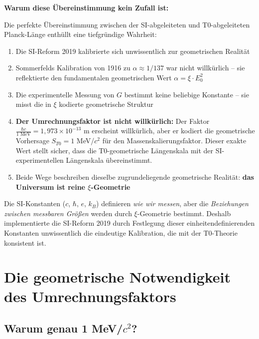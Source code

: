 \documentclass[12pt,a4paper]{article}
\begin{document}
	\begin{warning}
		\textbf{Warum diese {\"U}bereinstimmung kein Zufall ist:}
		
		Die perfekte {\"U}bereinstimmung zwischen der SI-abgeleiteten und T0-abgeleiteten Planck-L{\"a}nge enth{\"u}llt eine tiefgr{\"u}ndige Wahrheit:
		
		\begin{enumerate}
			\item Die SI-Reform 2019 kalibrierte sich unwissentlich zur geometrischen Realit{\"a}t
			
			\item Sommerfelds Kalibration von 1916 zu $\alpha \approx 1/137$ war nicht willk{\"u}rlich -- sie reflektierte den fundamentalen geometrischen Wert $\alpha = \xi \cdot E_0^2$
			
			\item Die experimentelle Messung von $G$ bestimmt keine beliebige Konstante -- sie misst die in $\xi$ kodierte geometrische Struktur
			
			\item \textbf{Der Umrechnungsfaktor ist nicht willk{\"u}rlich:} Der Faktor $\frac{\hbar c}{1 \text{ MeV}} = 1{,}973 \times 10^{-13}$ m erscheint willk{\"u}rlich, aber er kodiert die geometrische Vorhersage $S_{T0} = 1$ MeV/$c^2$ f{\"u}r den Massenskalierungsfaktor. Dieser exakte Wert stellt sicher, dass die T0-geometrische L{\"a}ngenskala mit der SI-experimentellen L{\"a}ngenskala {\"u}bereinstimmt.
			
			\item Beide Wege beschreiben dieselbe zugrundeliegende geometrische Realit{\"a}t: \textbf{das Universum ist reine $\xi$-Geometrie}
		\end{enumerate}
		
		Die SI-Konstanten ($c$, $\hbar$, $e$, $k_B$) definieren \emph{wie wir messen}, aber die \emph{Beziehungen zwischen messbaren Gr{\"o}{\ss}en} werden durch $\xi$-Geometrie bestimmt. Deshalb implementierte die SI-Reform 2019 durch Festlegung dieser einheitendefinierenden Konstanten unwissentlich die eindeutige Kalibration, die mit der T0-Theorie konsistent ist.
	\end{warning}
	
	\section{Die geometrische Notwendigkeit des Umrechnungsfaktors}
	
	\subsection{Warum genau 1 MeV/$c^2$?}
	
\end{document}
